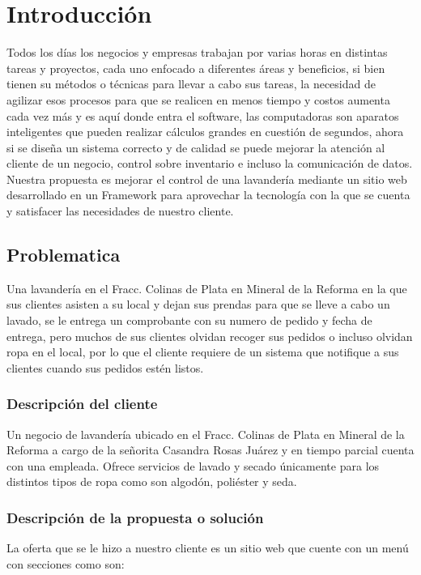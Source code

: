 \section{Introducción}
Todos los días los negocios y empresas trabajan por varias horas en distintas tareas y proyectos, cada uno enfocado a diferentes áreas y beneficios, si bien tienen su métodos o técnicas para llevar a cabo sus tareas, la necesidad de agilizar esos procesos para que se realicen en menos tiempo y costos aumenta cada vez más y es aquí donde entra el software, las computadoras son aparatos inteligentes que pueden realizar cálculos grandes en cuestión de segundos, ahora si se diseña un sistema correcto y de calidad se puede mejorar la atención al cliente de un negocio, control sobre inventario e incluso la comunicación de datos. Nuestra propuesta es mejorar el control de una lavandería mediante un sitio web desarrollado en un Framework para aprovechar la tecnología con la que se cuenta y satisfacer las necesidades de nuestro cliente. 




\subsection{Problematica}
Una lavandería en el Fracc. Colinas de Plata en Mineral de la Reforma en la que sus clientes asisten a su local y dejan sus prendas para que se lleve a cabo un lavado, se le entrega un comprobante con su numero de pedido y fecha de entrega, pero muchos de sus clientes olvidan recoger sus pedidos o incluso olvidan ropa en el local, por lo que el cliente requiere de un sistema que notifique a sus clientes cuando sus pedidos estén listos.
\subsubsection{Descripción del cliente}
Un negocio de lavandería ubicado en el Fracc. Colinas de Plata en Mineral de la Reforma a cargo de la señorita Casandra Rosas Juárez y en tiempo parcial cuenta con una empleada. Ofrece servicios de lavado y secado únicamente para los distintos tipos de ropa como son algodón, poliéster y seda.

\subsubsection{Descripción de la propuesta o solución}
La oferta que se le hizo a nuestro cliente es un sitio web que cuente con un menú con secciones como son:

